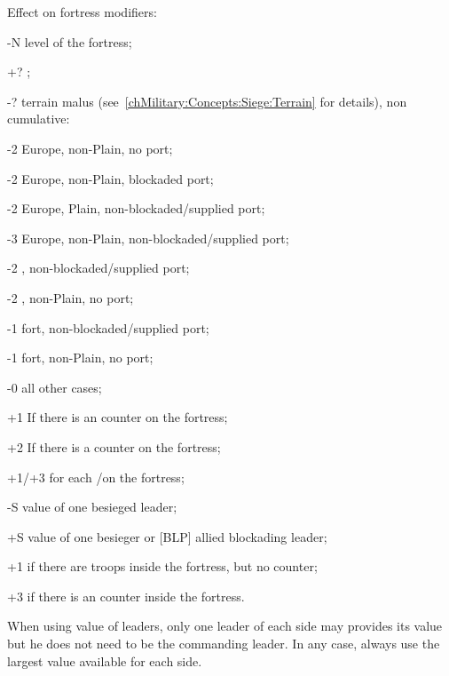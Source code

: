 
Effect on fortress modifiers:
\begin{modlist}
\item[-N] level of the fortress;
\item[+?] ;
\item[-?] terrain malus (see~\ref{chMilitary:Concepts:Siege:Terrain} for
  details), non cumulative:
  \begin{modlisti}
  \item[-2] Europe, non-Plain, no port;
  \item[-2] Europe, non-Plain, blockaded port;
  \item[-2] Europe, Plain, non-blockaded/supplied port;
  \item[-3] Europe, non-Plain, non-blockaded/supplied port;
  \item[-2] \ROTW, non-blockaded/supplied port;
  \item[-2] \ROTW, non-Plain, no port;
  \item[-1] fort, non-blockaded/supplied port;
  \item[-1] fort, non-Plain, no port;
  \item[-0] all other cases;
  \end{modlisti}
\item[+1] If there is an \ASSAULT counter on the fortress;
\item[+2] If there is a \BREACH counter on the fortress;
\item[+1/+3] for each \USURE\facemoins/\faceplus on the fortress;
\item[-S]  value of one besieged leader;
\item[+S]  value of one besieger or [BLP] allied blockading
  leader;
\item[+1] if there are troops inside the fortress, but no \ARMY counter;
\item[+3] if there is an \ARMY counter inside the fortress.
\end{modlist}

When using  value of leaders, only one leader of each side may
provides its value but he does not need to be the commanding leader. In any
case, always use the largest  value available for each side.

